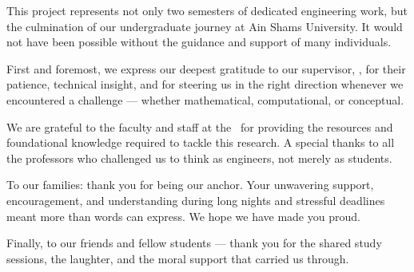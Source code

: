 \documentclass[11pt, a4paper, twoside, openright]{book}
\begin{document}
\begin{acknowledgements}
\addchaptertocentry{\acknowledgementname}

This project represents not only two semesters of dedicated engineering work,
but the culmination of our undergraduate journey at Ain Shams University.
It would not have been possible without the guidance and support of many
individuals.

First and foremost, we express our deepest gratitude to our supervisor,
\supname, for their patience, technical insight, and for steering us in the
right direction whenever we encountered a challenge --- whether mathematical,
computational, or conceptual.

We are grateful to the faculty and staff at the \deptname\ for providing the
resources and foundational knowledge required to tackle this research.  A
special thanks to all the professors who challenged us to think as engineers,
not merely as students.

To our families: thank you for being our anchor.  Your unwavering support,
encouragement, and understanding during long nights and stressful deadlines
meant more than words can express.  We hope we have made you proud.

Finally, to our friends and fellow students --- thank you for the shared study
sessions, the laughter, and the moral support that carried us through.

\end{acknowledgements}

\tableofcontents
\clearpage

{}
\listoffigures
\clearpage

{}
\listoftables
\clearpage
\end{document}
